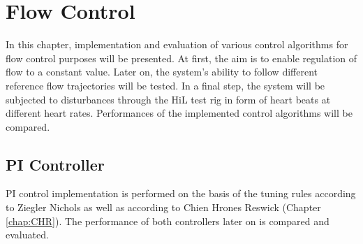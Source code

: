 \chapter{Flow Control}
In this chapter, implementation and evaluation of various control algorithms for flow control purposes will be presented. At first, the aim is to enable regulation of flow to a constant value. Later on, the system's ability to follow different reference flow trajectories will be tested. In a final step, the system will be subjected to disturbances through the HiL test rig in form of heart beats at different heart rates. Performances of the implemented control algorithms will be compared.
\section{PI Controller}
PI control implementation is performed on the basis of the tuning rules according to Ziegler Nichols as well as according to Chien Hrones Reswick (Chapter \ref{chap:CHR}). The performance of both controllers later on is  compared and evaluated.

